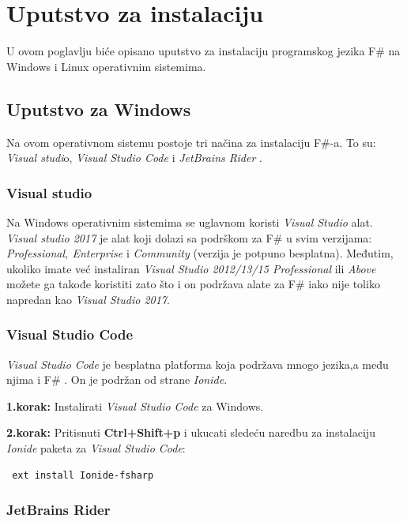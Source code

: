 \documentclass[a4paper]{article}
\begin{document}
\section{Uputstvo za instalaciju}

U ovom poglavlju biće opisano uputstvo za instalaciju programskog jezika F\# na Windows i Linux operativnim sistemima.

\subsection{Uputstvo za Windows}

Na ovom operativnom sistemu postoje tri načina za instalaciju F\#-a. To su: {\em Visual studi}o\cite{vStud}, {\em Visual Studio Code} \cite{vStudCode} i {\em JetBrains Rider} \cite{jetBrains}.

\subsubsection{Visual studio}
	
Na Windows operativnim sistemima se uglavnom koristi {\em Visual Studio} alat. {\em Visual studio 2017} je alat koji dolazi sa podrškom za F\# u svim verzijama: {\em Professional, Enterprise} i {\em Community} (verzija je potpuno besplatna). Međutim, ukoliko imate  već instaliran {\em Visual Studio 2012/13/15  Professional} ili {\em Above} možete ga takođe koristiti zato što i on podržava alate za F\# iako nije toliko napredan kao {\em Visual Studio 2017}.

\subsubsection{Visual Studio Code}
	
{\em Visual Studio Code} je besplatna platforma koja podržava mnogo jezika,a među njima i F\# . On je podržan od strane {\em Ionide}\cite{ionide}.

\textbf{1.korak:} Instalirati {\em Visual Studio Code} za Windows.

\textbf{2.korak:} Pritisnuti \textbf{Ctrl+Shift+p} i ukucati sledeću naredbu za instalaciju {\em Ionide} paketa za {\em Visual Studio Code}:
\\
\begin{lstlisting}
 ext install Ionide-fsharp
\end{lstlisting}
 
\subsubsection{JetBrains Rider}
\end{document}
